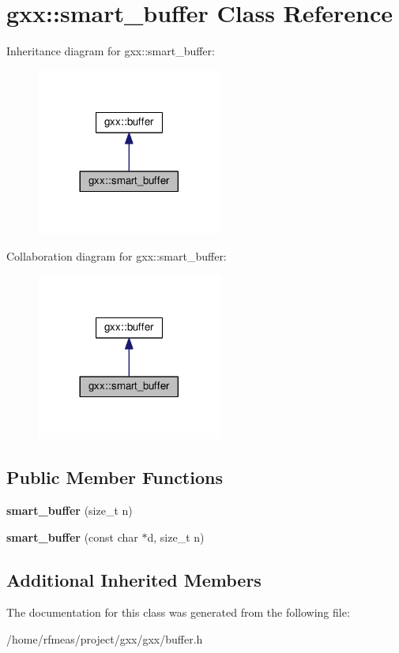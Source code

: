 \hypertarget{classgxx_1_1smart__buffer}{}\section{gxx\+:\+:smart\+\_\+buffer Class Reference}
\label{classgxx_1_1smart__buffer}


Inheritance diagram for gxx\+:\+:smart\+\_\+buffer\+:\nopagebreak
\begin{figure}[H]
\begin{center}
\leavevmode
\includegraphics[width=173pt]{classgxx_1_1smart__buffer__inherit__graph}
\end{center}
\end{figure}


Collaboration diagram for gxx\+:\+:smart\+\_\+buffer\+:\nopagebreak
\begin{figure}[H]
\begin{center}
\leavevmode
\includegraphics[width=173pt]{classgxx_1_1smart__buffer__coll__graph}
\end{center}
\end{figure}
\subsection*{Public Member Functions}
\begin{DoxyCompactItemize}
\item 
{\bfseries smart\+\_\+buffer} (size\+\_\+t n)\hypertarget{classgxx_1_1smart__buffer_a9ce2b3e1ea4807a36a2874ea8defabbe}{}\label{classgxx_1_1smart__buffer_a9ce2b3e1ea4807a36a2874ea8defabbe}

\item 
{\bfseries smart\+\_\+buffer} (const char $\ast$d, size\+\_\+t n)\hypertarget{classgxx_1_1smart__buffer_a483b194ae2f8b70eb265b131d06a015d}{}\label{classgxx_1_1smart__buffer_a483b194ae2f8b70eb265b131d06a015d}

\end{DoxyCompactItemize}
\subsection*{Additional Inherited Members}


The documentation for this class was generated from the following file\+:\begin{DoxyCompactItemize}
\item 
/home/rfmeas/project/gxx/gxx/buffer.\+h\end{DoxyCompactItemize}
